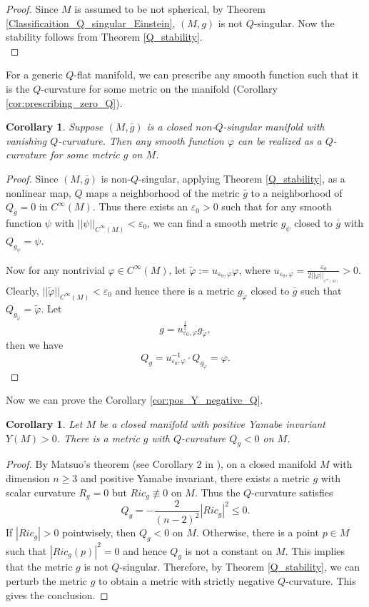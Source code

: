 \documentclass[12pt]{amsart}
\newtheorem{corollary}[theorem]{Corollary}
\theoremstyle{definition}
\theoremstyle{remark}
\numberwithin{equation}{section}
\begin{document}
\begin{proof}

Since $M$ is assumed to be not spherical, by Theorem \ref{Classificaition_Q_singular_Einstein}, $(M,g)$ is not $Q$-singular. Now the stability follows from Theorem \ref{Q_stability}. \\
\end{proof}

For a generic $Q$-flat manifold, we can prescribe any smooth function such that it is the $Q$-curvature for some metric on the manifold (Corollary \ref{cor:prescribing_zero_Q}).

\begin{corollary}
Suppose $(M, \bar g)$ is a closed non-$Q$-singular manifold with vanishing $Q$-curvature. Then any smooth function $\varphi$ can be realized as a $Q$-curvature for some metric $ g$ on $M$.
\end{corollary}
\begin{proof}
Since $(M, \bar g)$ is non-$Q$-singular, applying Theorem \ref{Q_stability}, as a nonlinear map, $Q$ maps a neighborhood of the metric $\bar g$ to a neighborhood of $Q_{\bar g} = 0$ in $C^\infty(M)$. Thus there exists an $\varepsilon_0 > 0$ such that for any smooth function $\psi$ with $||\psi||_{C^\infty(M)}< \varepsilon_0$, we can find a smooth metric $g_\psi$ closed to $\bar g$ with $Q_{g_\psi} = \psi$.

Now for any nontrivial $\varphi \in C^\infty(M)$, let $\tilde \varphi:= u_{\varepsilon_0 , \varphi}\varphi$, where $u_{\varepsilon_0 , \varphi} = \frac{\varepsilon_0 }{2 ||\varphi||_{_{C^\infty(M)}}} > 0$. Clearly, $||\tilde \varphi||_{C^\infty(M)} < \varepsilon_0$ and hence there is a metric $g_{\tilde \varphi}$ closed to $\bar g$ such that $Q_{g_{\tilde \varphi}} = \tilde \varphi$. Let 
$$g = u_{\varepsilon_0 , \varphi}^{\frac{1}{2}} g_{\tilde \varphi},$$ then we have $$Q_g = u_{\varepsilon_0 , \varphi}^{-1} \cdot Q_{g_{\tilde \varphi}} =  \varphi.$$
\end{proof}

Now we can prove the Corollary \ref{cor:pos_Y_negative_Q}.
\begin{corollary}
Let $M$ be a closed manifold with positive Yamabe invariant $Y(M) > 0$. There is a metric $g$ with $Q$-curvature $Q_g < 0$ on $M$. 
\end{corollary}
\begin{proof}
By Matsuo's theorem (see Corollary 2 in \cite{Mat14}), on a closed manifold $M$ with dimension $n\geq 3$ and positive Yamabe invariant, there exists a metric $g$ with scalar curvature $R_g = 0$ but $Ric_g \not\equiv 0$ on $M$. Thus the $Q$-curvature satisfies $$Q_g = - \frac{2}{(n-2)^2} |Ric_g|^2 \leq 0.$$
If $|Ric_g|>0$ pointwisely, then $Q_g < 0$ on $M$. Otherwise, there is a point $p \in M$ such that $|Ric_g(p)|^2 = 0$ and hence $Q_g$ is not a constant on $M$. This implies that the metric $g$ is not $Q$-singular. Therefore, by Theorem \ref{Q_stability}, we can perturb the metric $g$ to obtain a metric with strictly negative $Q$-curvature. This gives the conclusion.
\end{proof}
\end{document}
